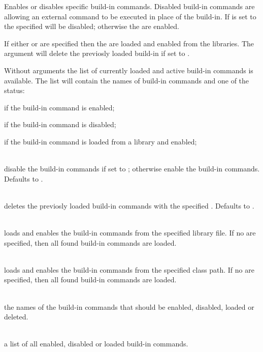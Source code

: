%


Enables or disables specific build-in commands. Disabled build-in commands
are allowing an external command to be executed in place of the build-in.
If  is set to \TypeTrue the specified  will be disabled;
otherwise the  are enabled. 

If either  or 
are specified then the  are loaded and enabled from the libraries.
The  argument will delete the previosly loaded build-in if set to \TypeTrue.

Without arguments the list of currently loaded and active build-in commands
is available. The list will contain the names of build-in commands and one of the 
 status:

\begin{compactitem}
%
\item {}
if the build-in command is enabled;
%
\item {}
if the build-in command is disabled;
%
\item {}
if the build-in command is loaded from a library and enabled;
%
\end{compactitem}


\begin{asparadesc}
%
\item[\code{disable: true|false}] \hfill \\
disable the  build-in commands if set to \TypeTrue; otherwise
enable the  build-in commands. Defaults to \TypeFalse.
%
\item[\code{delete: true|false}] \hfill \\
deletes the previosly loaded build-in commands with the 
specified . Defaults to \TypeFalse.
%
\item[\code{library: filename}] \hfill \\
loads and enables the  build-in commands from the specified 
library file. If no  are specified, then all found build-in 
commands are loaded.
%
\item[\code{classpath: path}] \hfill \\
loads and enables the  build-in commands from the specified 
class path. If no  are specified, then all found build-in 
commands are loaded.
%
\item[\code{names...}] \hfill \\
the names of the build-in commands that should be enabled, disabled,
loaded or deleted.
%
\item[\code{theCommands}] \hfill \\
a list of all enabled, disabled or loaded build-in commands.
%
\end{asparadesc}

